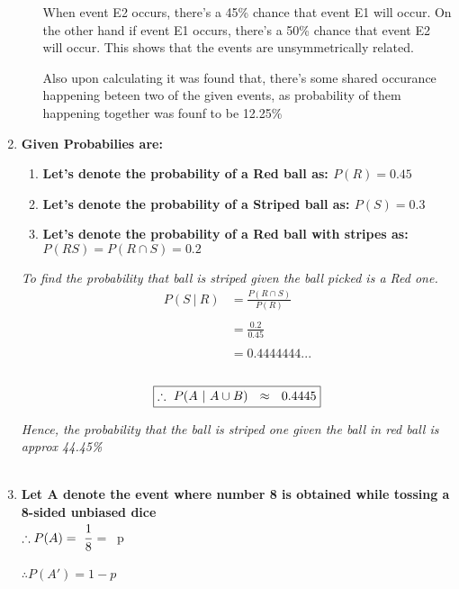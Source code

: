 \documentclass{article}
\begin{document}
\begin{enumerate}
\begin{enumerate}
    \textnormal{When event E2 occurs, there's a 45\% chance that event E1 will occur. On the other hand if event E1 occurs, there's a 50\% chance that event E2 will occur.}
    \textnormal{This shows that the events are unsymmetrically related.}
    
    \textnormal{Also upon calculating it was found that, there's some shared occurance happening beteen two of the given events,}
    \textnormal{as probability of them happening together was founf to be 12.25\%}
  \end{enumerate}

\newpage
\item\textbf{Given Probabilies are:}\\
  \begin{enumerate}
    \item\textbf{Let's denote the probability of a Red ball as:  $P(R) = 0.45$}
    \item\textbf{Let's denote the probability of a Striped ball as:  $P(S) = 0.3$}
    \item\textbf{Let's denote the probability of a Red ball with stripes as:  $P(RS) = P(R \cap S) = 0.2$}\\
  \end{enumerate}
  \textit{To find the probability that ball is striped given the ball picked is a Red one.}\\
  \begin{align*}
    P(S \ |\ R) & = \frac{P(R \cap S)}{P(R)}\\\\
    & = \frac{0.2}{0.45}\\\\
    & = 0.4444444...
  \end{align*}\\
  \[
     \boxed{\therefore\ P(A \ |\ A \cup B)\ \ \approx \ \ 0.4445}\\
  \]

  \textit{Hence, the probability that the ball is striped one given the ball in red ball is approx 44.45\%}\\\\

\newpage  
\item \textbf{Let A denote the event where number 8 is obtained while tossing a 8-sided unbiased dice}\\
$\therefore P(A) = \ \cfrac{1}{8}$ = \ p\\\\
$\therefore P(A') = 1 - p $  


\end{enumerate}
\end{document}
